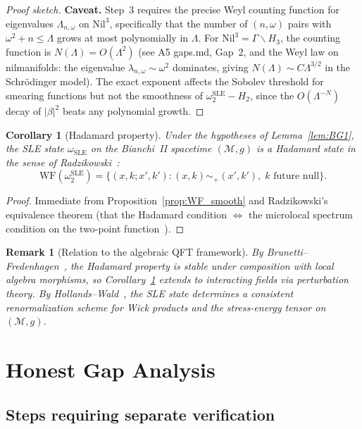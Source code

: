 \documentclass[11pt, a4paper]{article}
\newtheorem{corollary}[theorem]{Corollary}
\newtheorem{remark}[theorem]{Remark}
\newcommand{\Nil}{\mathrm{Nil}^3}
\newcommand{\WF}{\mathrm{WF}}
\newcommand{\lam}{\lambda}
\newcommand{\om}{\omega}
\newcommand{\Lam}{\Lambda}
\begin{document}
\begin{proof}[Proof sketch]
  \textbf{Caveat.}
  Step~3 requires the precise Weyl counting function for eigenvalues $\Lam_{n,\om}$
  on $\Nil$, specifically that the number of $(n, \om)$ pairs with
  $\om^2 + n \leq \Lam$ grows at most polynomially in $\Lam$.
  For $\Nil = \Gamma \backslash H_3$, the counting function is
  $N(\Lam) = O(\Lam^2)$ (see A5 gaps.md, Gap~2, and the Weyl law
  on nilmanifolds: the eigenvalue $\lam_{n,\om} \sim \om^2$
  dominates, giving $N(\Lam) \sim C\Lam^{3/2}$ in the Schrödinger model).
  The exact exponent affects the Sobolev threshold for smearing functions
  but not the smoothness of $\omega_2^{\mathrm{SLE}} - H_2$,
  since the $O(\Lam^{-N})$ decay of $|\beta|^2$ beats any polynomial growth.
\end{proof}

\begin{corollary}[Hadamard property]\label{cor:Hadamard}
  Under the hypotheses of Lemma~\ref{lem:BG1},
  the SLE state $\omega_{\mathrm{SLE}}$ on the Bianchi~II spacetime
  $(\mathcal{M}, g)$ is a Hadamard state in the sense of
  Radzikowski~\cite{Rad96}:
  \begin{equation}
    \WF(\omega_2^{\mathrm{SLE}})
    = \{(x,k; x',k') : (x,k) \sim_+ (x',k'),\; k \text{ future null}\}.
  \end{equation}
\end{corollary}

\begin{proof}
  Immediate from Proposition~\ref{prop:WF_smooth} and Radzikowski's
  equivalence theorem (that the Hadamard condition $\iff$ the
  microlocal spectrum condition on the two-point function~\cite{Rad96}).
\end{proof}

\begin{remark}[Relation to the algebraic QFT framework]
  By Brunetti--Fredenhagen~\cite{BF00}, the Hadamard property
  is stable under composition with local algebra morphisms,
  so Corollary~\ref{cor:Hadamard} extends to interacting fields
  via perturbation theory.
  By Hollands--Wald~\cite{HW01}, the SLE state determines a
  consistent renormalization scheme for Wick products and
  the stress-energy tensor on $(\mathcal{M}, g)$.
\end{remark}

\section{Honest Gap Analysis}

\subsection{Steps requiring separate verification}
\end{document}
